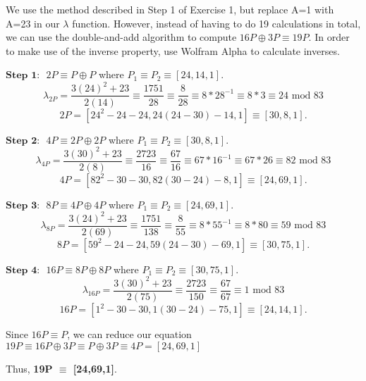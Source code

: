 \documentclass[12pt]{article}
\begin{document}
\begin{enumerate}
We use the method described in Step 1 of Exercise 1, but replace A=1 with A=23 in our $\lambda$ function. However, instead of having to do 19 calculations in total, we can use the double-and-add algorithm to compute $16P \oplus 3P \equiv 19P$. In order to make use of the inverse property, use Wolfram Alpha to calculate inverses.

$\textbf{Step 1: }$ $2P\equiv P \oplus P$ where $P_1 \equiv P_2 \equiv [24,14,1]$.\\
\[\lambda_{2P}=\frac{3(24)^2+23}{2(14)}\equiv \frac{1751}{28}\equiv \frac{8}{28} \equiv 8*28^{-1} \equiv 8*3 \equiv 24 \text{ mod 83}\]
\[2P= [24 ^2 - 24 - 24, 24 (24 - 30) - 14, 1 ] \equiv [30,8,1].\]

$\textbf{Step 2: }$ $4P\equiv 2P \oplus 2P$ where $P_1 \equiv P_2 \equiv [30,8,1]$.\\
\[\lambda_{4P}=\frac{3(30)^2+23}{2(8)}\equiv \frac{2723}{16}\equiv \frac{67}{16} \equiv 67*16^{-1} \equiv 67*26 \equiv 82 \text{ mod 83}\]
\[4P= [82 ^2 - 30 - 30, 82 (30 - 24) - 8, 1 ] \equiv [24,69,1].\]

$\textbf{Step 3: }$ $8P\equiv 4P \oplus 4P$ where $P_1 \equiv P_2 \equiv [24,69,1]$.\\
\[\lambda_{8P}=\frac{3(24)^2+23}{2(69)}\equiv \frac{1751}{138}\equiv \frac{8}{55} \equiv 8*55^{-1} \equiv 8*80 \equiv 59 \text{ mod 83}\]
\[8P= [59 ^2 - 24 - 24, 59 (24 - 30) - 69, 1 ] \equiv [30,75,1].\]

$\textbf{Step 4: }$ $16P\equiv 8P \oplus 8P$ where $P_1 \equiv P_2 \equiv [30,75,1]$.\\
\[\lambda_{16P}=\frac{3(30)^2+23}{2(75)}\equiv \frac{2723}{150}\equiv \frac{67}{67} \equiv 1 \text{ mod 83}\]
\[16P= [1 ^2 - 30 - 30, 1 (30 - 24) - 75, 1 ] \equiv [24,14,1].\]

Since $16P\equiv P$, we can reduce our equation $19P\equiv 16P\oplus 3P\equiv P\oplus 3P\equiv 4P=[24,69,1]$

Thus, \textbf{19P $\equiv$ [24,69,1]}.
\end{enumerate}
\end{document}
